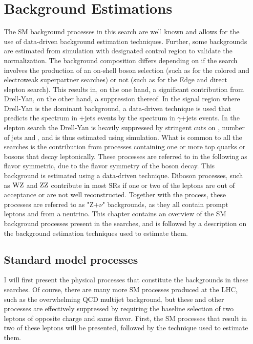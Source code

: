 \chapter{Background Estimations}\label{sec:backgrounds}
\noindent
\justify
The SM background processes in this search are well known and allows for the use of data-driven background estimation techniques. 
Further, some backgrounds are estimated from simulation with designated control region to validate the normalization. 
The background composition differs depending on if the search involves the production of an on-shell \PZ boson selection (such as for the colored and electroweak superpartner searches) or not (such as for the Edge and direct slepton search). 
This results in, on the one hand, a significant contribution from Drell-Yan, on the other hand, a suppression thereof. 
In the signal region where Drell-Yan is the dominant background, a data-driven technique is used that predicts the \ptmiss spectrum in \PZ+jets events by the \ptmiss spectrum in $\gamma$+jets events.
In the slepton search the Drell-Yan is heavily suppressed by stringent cuts on \ptmiss, number of jets and \mttwo, and is thus estimated using simulation.  
What is common to all the searches is the contribution from processes containing one or more top quarks or \PW bosons that decay leptonically. 
These processes are referred to in the following as flavor symmetric, due to the flavor symmetry of the \PW boson decay. 
This background is estimated using a data-driven technique. 
Diboson processes, such as $\mathrm{WZ}$ and $\mathrm{ZZ}$ contribute in most SRs if one or two of the leptons are out of acceptance or are not well reconstructed. 
Together with the \ttZ process, these processes are referred to as "Z+$\nu$" backgrounds, as they all contain prompt leptons and \ptmiss from a neutrino.   
\newpara
\noindent\justify
This chapter contains an overview of the SM background processes present in the searches, and is followed by a description on the background estimation techniques used to estimate them. 
\newpage
\section{Standard model processes}
\noindent\justify
I will first present the physical processes that constitute the backgrounds in these searches. 
Of course, there are many more SM processes produced at the LHC, such as the overwhelming QCD multijet background, but these and other processes are effectively suppressed by requiring the baseline selection of two leptons of opposite charge and same flavor. 
First, the SM processes that result in two of these leptons will be presented, followed by the technique used to estimate them. 
